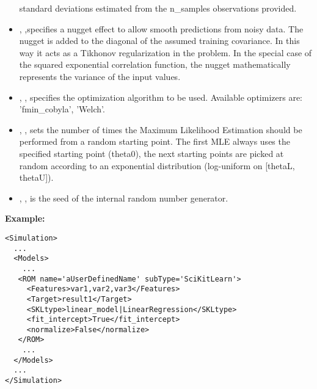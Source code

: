 \begin{itemize}
  standard deviations estimated from the n\_samples observations provided.
  \item {}, ,specifies a nugget
  effect to allow smooth predictions from noisy data.
  The nugget is added to the diagonal of the assumed training covariance.
  In this way it acts as a Tikhonov regularization in the problem.
  In the special case of the squared exponential correlation function, the
  nugget mathematically represents the variance of the input values.
  \item {}, , specifies the
  optimization algorithm to be used.
  Available optimizers are: 'fmin\_cobyla', 'Welch'.
  \item {}, , sets the
  number of times the Maximum Likelihood Estimation should be performed from
  a random starting point.
  The first MLE always uses the specified starting point (theta0), the next
  starting points are picked at random according to an exponential distribution
  (log-uniform on [thetaL, thetaU]).
  \item {}, , is the seed
  of the internal random number generator.
\end{itemize}


\textbf{Example:}
\begin{lstlisting}[style=XML,morekeywords={name,subType}]
<Simulation>
  ...
  <Models>
    ...
   <ROM name='aUserDefinedName' subType='SciKitLearn'>
     <Features>var1,var2,var3</Features>
     <Target>result1</Target>
     <SKLtype>linear_model|LinearRegression</SKLtype>
     <fit_intercept>True</fit_intercept>
     <normalize>False</normalize>
   </ROM>
    ...
  </Models>
  ...
</Simulation>
\end{lstlisting}


